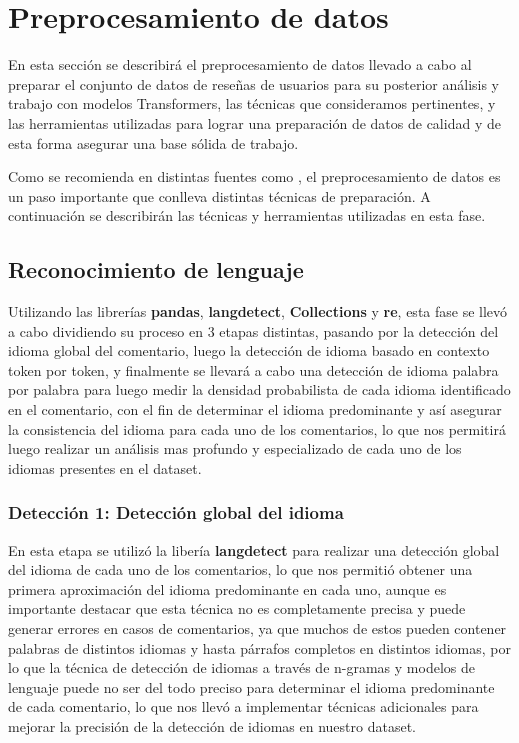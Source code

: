 \chapter{\textbf{Preprocesamiento de datos}}
\label{cha:preprocesamiento_datos}

En esta sección se describirá el preprocesamiento de datos llevado a cabo al preparar el conjunto de datos de reseñas de usuarios para su posterior análisis y trabajo con modelos Transformers, las técnicas que consideramos pertinentes, y las herramientas utilizadas para lograr una preparación de datos de calidad y de esta forma asegurar una base sólida de trabajo.

Como se recomienda en distintas fuentes como \cite{Agrawal2024TextPreprocessing}, el preprocesamiento de datos es un paso importante que conlleva distintas técnicas de preparación. A continuación se describirán las técnicas y herramientas utilizadas en esta fase.

\section{\textbf{Reconocimiento de lenguaje}} %
Utilizando las librerías \textbf{pandas}, \textbf{langdetect}, \textbf{Collections} y \textbf{re}, esta fase se llevó a cabo dividiendo su proceso en 3 etapas distintas, pasando por la detección del idioma global del comentario, luego la detección de idioma basado en contexto token por token, y finalmente se llevará a cabo una detección de idioma palabra por palabra para luego medir la densidad probabilista de cada idioma identificado en el comentario, con el fin de determinar el idioma predominante y así asegurar la consistencia del idioma para cada uno de los comentarios, lo que nos permitirá luego realizar un análisis mas profundo y especializado de cada uno de los idiomas presentes en el dataset.

\subsection{\textbf{Detección 1: Detección global del idioma}}
\label{cha:global_detection_lang}

En esta etapa se utilizó la libería \textbf{langdetect} para realizar una detección global del idioma de cada uno de los comentarios, lo que nos permitió obtener una primera aproximación del idioma predominante en cada uno, aunque es importante destacar que esta técnica no es completamente precisa y puede generar errores en casos de comentarios, ya que muchos de estos pueden contener palabras de distintos idiomas y hasta párrafos completos en distintos idiomas, por lo que la técnica de detección de idiomas a través de n-gramas y modelos de lenguaje puede no ser del todo preciso para determinar el idioma predominante de cada comentario, lo que nos llevó a implementar técnicas adicionales para mejorar la precisión de la detección de idiomas en nuestro dataset.

